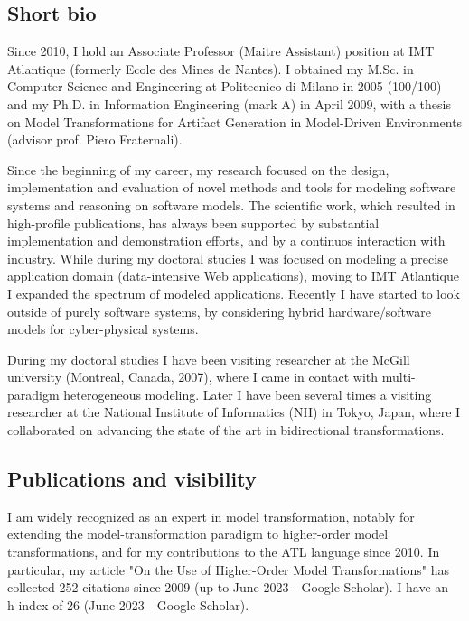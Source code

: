 
\subsection{Short bio}

Since 2010, I hold an Associate Professor (Maitre Assistant) position at IMT Atlantique (formerly Ecole des Mines de Nantes). 
I obtained my M.Sc. in Computer Science and Engineering at Politecnico di Milano in 2005 (100/100) and my Ph.D. in Information Engineering (mark A) in April 2009, with a thesis on Model Transformations for Artifact Generation in Model-Driven Environments (advisor prof. Piero Fraternali).

Since the beginning of my career, my research focused on the design, implementation and evaluation of novel methods and tools for modeling software systems and reasoning on software models. The scientific work, which resulted in high-profile publications, has always been supported by substantial implementation and demonstration efforts, and by a continuos interaction with industry. While during my doctoral studies I was focused on modeling a precise application domain (data-intensive Web applications), moving to IMT Atlantique I expanded the spectrum of modeled applications. Recently I have started to look outside of purely software systems, by considering hybrid hardware/software models for cyber-physical systems.

During my doctoral studies I have been visiting researcher at the McGill university (Montreal, Canada, 2007), where I came in contact with multi-paradigm heterogeneous modeling. Later I have been several times a visiting researcher at the National Institute of Informatics (NII) in Tokyo, Japan, where I collaborated on advancing the state of the art in bidirectional transformations.

\subsection{Publications and visibility}

I am widely recognized as an expert in model transformation, notably for extending the model-transformation paradigm to higher-order model transformations, and for my contributions to the ATL language since 2010. In particular, my article "On the Use of Higher-Order Model Transformations" has collected 252 citations since 2009 (up to June 2023 - Google Scholar). I have an h-index of 26 (June 2023 - Google Scholar).

